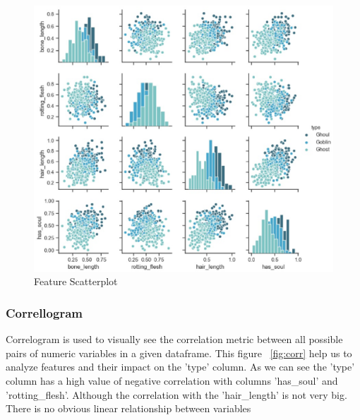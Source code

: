 \begin{figure}[htbp]
	\centering
	\label{fig:feature_scatterplot}
	\includegraphics[scale=0.3]{figures/pairplot.eps}
	\caption{Feature Scatterplot}
\end{figure}


\subsubsection{Correllogram}


Correlogram is used to 
visually see the correlation metric 
between all possible pairs of numeric variables 
in a given dataframe. 
This figure ~\cref{fig:corr} 
help us to analyze features 
and their impact on the 'type' column. 
As we can see the 'type' column 
has a high value of negative correlation 
with columns 'has_soul' and 'rotting_flesh'. 
Although the correlation 
with the 'hair_length' is not very big.
There is no obvious linear relationship 
between variables

